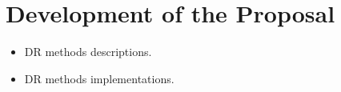 \section{Development of the Proposal}

\begin{itemize}
    \item DR methods descriptions.
    \item DR methods implementations.
\end{itemize}